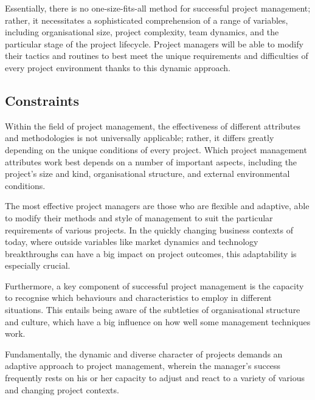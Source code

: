 \documentclass{article}
\begin{document}
Essentially, there is no one-size-fits-all method for successful project management; rather, it necessitates a sophisticated comprehension of a range of variables, including organisational size, project complexity, team dynamics, and the particular stage of the project lifecycle. Project managers will be able to modify their tactics and routines to best meet the unique requirements and difficulties of every project environment thanks to this dynamic approach.\cite{hyvari2006success}

\subsection{Constraints}

Within the field of project management, the effectiveness of different attributes and methodologies is not universally applicable; rather, it differs greatly depending on the unique conditions of every project. Which project management attributes work best depends on a number of important aspects, including the project's size and kind, organisational structure, and external environmental conditions. 

The most effective project managers are those who are flexible and adaptive, able to modify their methods and style of management to suit the particular requirements of various projects. In the quickly changing business contexts of today, where outside variables like market dynamics and technology breakthroughs can have a big impact on project outcomes, this adaptability is especially crucial.

Furthermore, a key component of successful project management is the capacity to recognise which behaviours and characteristics to employ in different situations. This entails being aware of the subtleties of organisational structure and culture, which have a big influence on how well some management techniques work.

Fundamentally, the dynamic and diverse character of projects demands an adaptive approach to project management, wherein the manager's success frequently rests on his or her capacity to adjust and react to a variety of various and changing project contexts.\cite{markopoulos2005project}
\end{document}
